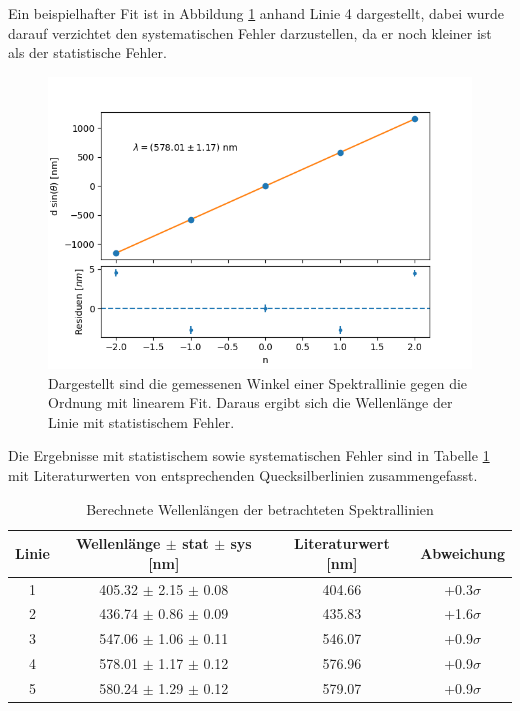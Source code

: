 \documentclass[12pt,a4paper]{article}
\begin{document}
	Ein beispielhafter Fit ist in Abbildung \ref{fig:fit_wellenlaengen} anhand Linie 4 dargestellt, dabei wurde darauf verzichtet den systematischen Fehler darzustellen, da er noch kleiner ist als der statistische Fehler.
	
	\begin{figure}
		\centering
		\includegraphics[scale=0.9]{Bilder/Gitter_Regression_Wellenlaengen_Linie_4.png}
		\caption{Dargestellt sind die gemessenen Winkel einer Spektrallinie gegen die Ordnung mit linearem Fit. Daraus ergibt sich die Wellenlänge der Linie mit statistischem Fehler.}
		\label{fig:fit_wellenlaengen}
	\end{figure}
	
	Die Ergebnisse mit statistischem sowie systematischen Fehler sind in Tabelle \ref{tab:ergebnisse_wellenlängen} mit Literaturwerten von entsprechenden Quecksilberlinien zusammengefasst.
	
	\begin{table}
		\centering
		\begin{tabular}{|c|c|c|c|}
			\hline
			Linie & Wellenlänge $\pm$ stat $\pm$ sys [nm] & Literaturwert [nm] & Abweichung\\
			\hline
			\hline
			1 & 405.32 $\pm$ 2.15 $\pm$ 0.08 & 404.66 & +0.3$\sigma$ \\
			\hline
			2 & 436.74 $\pm$ 0.86 $\pm$ 0.09 & 435.83 & +1.6$\sigma$ \\
			\hline
			3 & 547.06 $\pm$ 1.06 $\pm$ 0.11 & 546.07 & +0.9$\sigma$ \\
			\hline
			4 & 578.01 $\pm$ 1.17 $\pm$ 0.12 & 576.96 & +0.9$\sigma$ \\
			\hline
			5 & 580.24 $\pm$ 1.29 $\pm$ 0.12 & 579.07 & +0.9$\sigma$\\
			\hline
		\end{tabular}
		\caption{Berechnete Wellenlängen der betrachteten Spektrallinien}
		\label{tab:ergebnisse_wellenlängen}
	\end{table}
	
\end{document}
